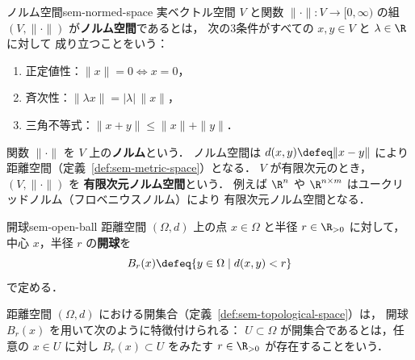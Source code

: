 \begin{definition}{ノルム空間}{sem-normed-space}
  実ベクトル空間 $V$ と関数 $\|\cdot\| \colon V \to [0, \infty)$ の組
  $(V, \|\cdot\|)$ が\textbf{ノルム空間}であるとは，
  次の3条件がすべての $x, y \in V$ と $\lambda \in \R$ に対して
  成り立つことをいう：
  \begin{enumerate}
    \item[(i)] 正定値性：$\|x\| = 0 \iff x = 0$，
    \item[(ii)] 斉次性：$\|\lambda x\| = |\lambda|\,\|x\|$，
    \item[(iii)] 三角不等式：$\|x + y\| \leq \|x\| + \|y\|$．
  \end{enumerate}
  関数 $\|\cdot\|$ を $V$ 上の\textbf{ノルム}という．
  ノルム空間は $d(x, y) \defeq \|x - y\|$ により
  距離空間（定義~\ref{def:sem-metric-space}）となる．
  $V$ が有限次元のとき，$(V, \|\cdot\|)$ を
  \textbf{有限次元ノルム空間}という．
  例えば $\R^n$ や $\R^{n \times m}$ はユークリッドノルム（フロベニウスノルム）により
  有限次元ノルム空間となる．
\end{definition}

\begin{definition}{開球}{sem-open-ball}
  距離空間 $(\Omega, d)$ 上の点 $x \in \Omega$ と半径 $r \in \R_{>0}$ に対して，
  中心 $x$，半径 $r$ の\textbf{開球}を
  \[
    B_r(x) \defeq \{y \in \Omega \mid d(x, y) < r\}
  \]
  で定める．
\end{definition}

距離空間 $(\Omega, d)$ における開集合（定義~\ref{def:sem-topological-space}）は，
開球 $B_r(x)$ を用いて次のように特徴付けられる：
$U \subset \Omega$ が開集合であるとは，任意の $x \in U$ に対し
$B_r(x) \subset U$ をみたす $r \in \R_{>0}$ が存在することをいう．

